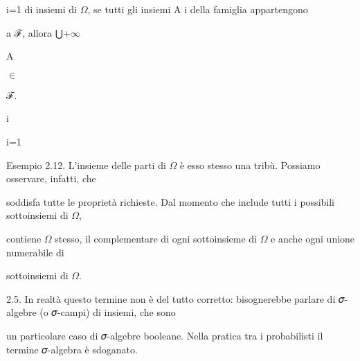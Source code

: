 \documentclass[a4paper,portrait,12pt]{article}
\begin{document}
\begin{flushleft}
i=1 di insiemi di $\Omega$, se tutti gli insiemi A i della famiglia appartengono
\end{flushleft}


\begin{flushleft}
a ℱ, allora ⋃+$\infty$
\end{flushleft}


\begin{flushleft}
A
\end{flushleft}


$\in$


\begin{flushleft}
ℱ.
\end{flushleft}


\begin{flushleft}
i
\end{flushleft}


\begin{flushleft}
i=1
\end{flushleft}


\begin{flushleft}
Esempio 2.12. L'insieme delle parti di $\Omega$ \`{e} esso stesso una tribù. Possiamo osservare, infatti, che
\end{flushleft}


\begin{flushleft}
soddisfa tutte le propriet\`{a} richieste. Dal momento che include tutti i possibili sottoinsiemi di $\Omega$,
\end{flushleft}


\begin{flushleft}
contiene $\Omega$ stesso, il complementare di ogni sottoinsieme di $\Omega$ e anche ogni unione numerabile di
\end{flushleft}


\begin{flushleft}
sottoinsiemi di $\Omega$.
\end{flushleft}


\begin{flushleft}
2.5. In realt\`{a} questo termine non \`{e} del tutto corretto: bisognerebbe parlare di 𝜎-algebre (o 𝜎-campi) di insiemi, che sono
\end{flushleft}


\begin{flushleft}
un particolare caso di 𝜎-algebre booleane. Nella pratica tra i probabilisti il termine 𝜎-algebra \`{e} sdoganato.
\end{flushleft}
\end{document}
